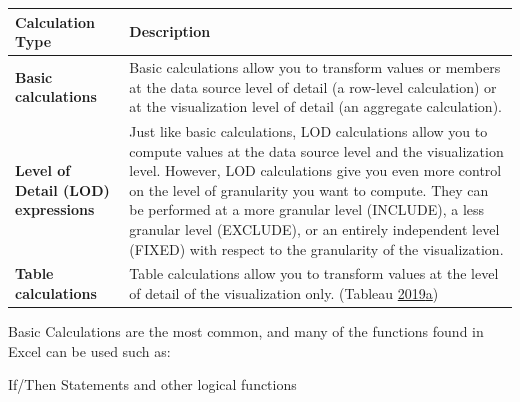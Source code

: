 \documentclass[]{book}
\begin{document}
\begin{longtable}[]{@{}ll@{}}
\toprule
\begin{minipage}[b]{0.15\columnwidth}\raggedright
\textbf{Calculation Type}\strut
\end{minipage} & \begin{minipage}[b]{0.79\columnwidth}\raggedright
\textbf{Description}\strut
\end{minipage}\tabularnewline
\midrule
\endhead
\begin{minipage}[t]{0.15\columnwidth}\raggedright
\textbf{Basic calculations}\strut
\end{minipage} & \begin{minipage}[t]{0.79\columnwidth}\raggedright
Basic calculations allow you to transform values or members at the data source level of detail (a row-level calculation) or at the visualization level of detail (an aggregate calculation).\strut
\end{minipage}\tabularnewline
\begin{minipage}[t]{0.15\columnwidth}\raggedright
\textbf{Level of Detail (LOD) expressions}\strut
\end{minipage} & \begin{minipage}[t]{0.79\columnwidth}\raggedright
Just like basic calculations, LOD calculations allow you to compute values at the data source level and the visualization level. However, LOD calculations give you even more control on the level of granularity you want to compute. They can be performed at a more granular level (INCLUDE), a less granular level (EXCLUDE), or an entirely independent level (FIXED) with respect to the granularity of the visualization.\strut
\end{minipage}\tabularnewline
\begin{minipage}[t]{0.15\columnwidth}\raggedright
\textbf{Table calculations}\strut
\end{minipage} & \begin{minipage}[t]{0.79\columnwidth}\raggedright
Table calculations allow you to transform values at the level of detail of the visualization only. (Tableau \protect\hyperlink{ref-Tableau_Calculated_Fields}{2019}\protect\hyperlink{ref-Tableau_Calculated_Fields}{a})\strut
\end{minipage}\tabularnewline
\bottomrule
\end{longtable}

Basic Calculations are the most common, and many of the functions found in Excel can be used such as:

If/Then Statements and other logical functions
\end{document}
